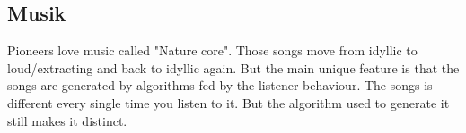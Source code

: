 

\subsection{Musik}

Pioneers love music called "Nature core". Those songs move from idyllic to loud/extracting and back to idyllic again. But the main unique feature is that the songs are generated by algorithms fed by the listener behaviour.
The songs is different every single time you listen to it. But the algorithm used to generate it still makes it distinct.

